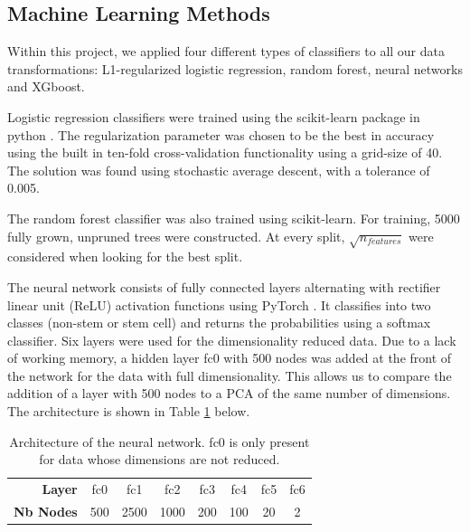 \documentclass[10pt,conference,compsocconf]{IEEEtran}
\begin{document}
\subsection{Machine Learning Methods}
Within this project, we applied four different types of classifiers to all our data transformations: L1-regularized logistic regression, random forest, neural networks and XGboost.
\par
Logistic regression classifiers were trained using the scikit-learn package in python \cite{scikit-learn}. The regularization parameter was chosen to be the best in accuracy using the built in ten-fold cross-validation functionality using a grid-size of 40. The solution was found using stochastic average descent, with a tolerance of 0.005. 
\par
The random forest classifier was also trained using scikit-learn. For training, 5000 fully grown, unpruned trees were constructed. At every split, $\sqrt{n_{features}}$ were considered when looking for the best split.  
\par
The neural network consists of fully connected layers alternating with rectifier linear unit (ReLU) activation functions using PyTorch \cite{paszke2017automatic}. It classifies into two classes (non-stem or stem cell) and returns the probabilities using a softmax classifier. Six layers were used for the dimensionality reduced data. Due to a lack of working memory, a hidden layer fc0 with 500 nodes was added at the front of the network for the data with full dimensionality. This allows us to compare the addition of a layer with 500 nodes to a PCA of the same number of dimensions. The architecture is shown in Table \ref{tab:ArchitectureNN} below.

\begin{table}[H]
	\centering
	\begin{tabular}{r|ccccccc}
\hline
  \textbf{Layer} &  fc0 &  fc1 & fc2 & fc3 & fc4 & fc5 & fc6 \\
  \textbf{Nb Nodes} &  500 &  2500 & 1000 & 200 & 100 & 20 & 2 \\
\hline
\end{tabular}
	\caption{Architecture of the neural network. fc0 is only present for data whose dimensions are not reduced.}
	\label{tab:ArchitectureNN}
	\vspace{-6mm}
\end{table}
\end{document}
